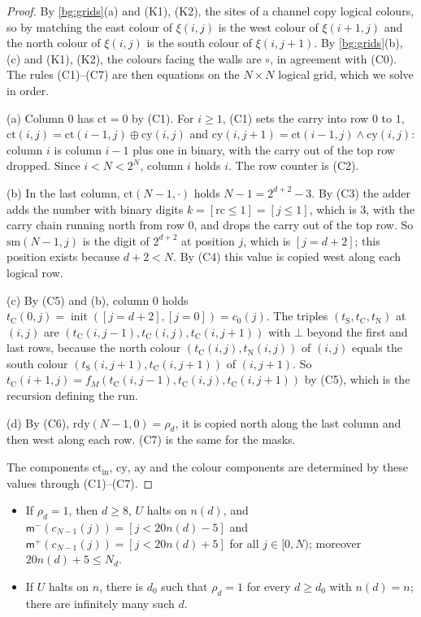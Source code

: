 \begin{proof}
By \cref{bg:grids}(a) and (K1), (K2), the sites of a channel copy logical colours, so by matching the east colour of $\xi(i,j)$ is the west colour of $\xi(i+1,j)$ and the north colour of $\xi(i,j)$ is the south colour of $\xi(i,j+1)$. By \cref{bg:grids}(b),(c) and (K1), (K2), the colours facing the walls are $\circ$, in agreement with (C0). The rules (C1)--(C7) are then equations on the $N\times N$ logical grid, which we solve in order.

(a) Column $0$ has $\mathrm{ct}=0$ by (C1). For $i\ge1$, (C1) sets the carry into row $0$ to $1$, $\mathrm{ct}(i,j)=\mathrm{ct}(i-1,j)\oplus\mathrm{cy}(i,j)$ and $\mathrm{cy}(i,j+1)=\mathrm{ct}(i-1,j)\wedge\mathrm{cy}(i,j)$: column $i$ is column $i-1$ plus one in binary, with the carry out of the top row dropped. Since $i<N<2^N$, column $i$ holds $i$. The row counter is (C2).

(b) In the last column, $\mathrm{ct}(N-1,\cdot)$ holds $N-1=2^{d+2}-3$. By (C3) the adder adds the number with binary digits $k=[\mathrm{rc}\le1]=[j\le1]$, which is $3$, with the carry chain running north from row $0$, and drops the carry out of the top row. So $\mathrm{sm}(N-1,j)$ is the digit of $2^{d+2}$ at position $j$, which is $[j=d+2]$; this position exists because $d+2<N$. By (C4) this value is copied west along each logical row.

(c) By (C5) and (b), column $0$ holds $t_{\mathrm C}(0,j)=\operatorname{init}([j=d+2],[j=0])=c_0(j)$. The triples $(t_{\mathrm S},t_{\mathrm C},t_{\mathrm N})$ at $(i,j)$ are $(t_{\mathrm C}(i,j-1),t_{\mathrm C}(i,j),t_{\mathrm C}(i,j+1))$ with $\bot$ beyond the first and last rows, because the north colour $(t_{\mathrm C}(i,j),t_{\mathrm N}(i,j))$ of $(i,j)$ equals the south colour $(t_{\mathrm S}(i,j+1),t_{\mathrm C}(i,j+1))$ of $(i,j+1)$. So $t_{\mathrm C}(i+1,j)=f_M(t_{\mathrm C}(i,j-1),t_{\mathrm C}(i,j),t_{\mathrm C}(i,j+1))$ by (C5), which is the recursion defining the run.

(d) By (C6), $\mathrm{rdy}(N-1,0)=\rho_d$, it is copied north along the last column and then west along each row. (C7) is the same for the masks.

The components $\mathrm{ct}_{\mathrm{in}}$, $\mathrm{cy}$, $\mathrm{ay}$ and the colour components are determined by these values through (C1)--(C7).
\end{proof}

\begin{lemma}[Readiness]\label{bg:ready}
\begin{itemize}
\item[(a)] If $\rho_d=1$, then $d\ge8$, $U$ halts on $n(d)$, and $\mathsf m^-(c_{N-1}(j))=[j<20n(d)-5]$ and $\mathsf m^+(c_{N-1}(j))=[j<20n(d)+5]$ for all $j\in[0,N)$; moreover $20n(d)+5\le N_d$.
\item[(b)] If $U$ halts on $n$, there is $d_0$ such that $\rho_d=1$ for every $d\ge d_0$ with $n(d)=n$; there are infinitely many such $d$.
\end{itemize}
\end{lemma}

